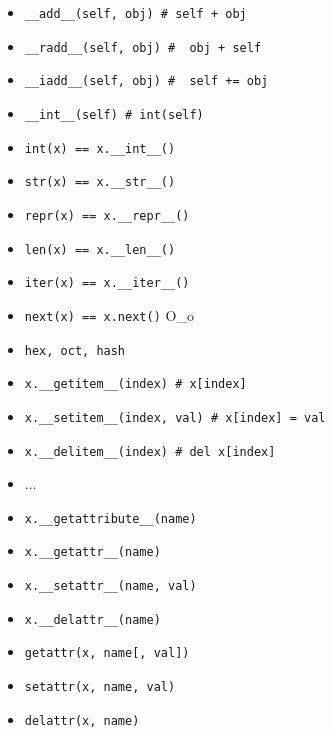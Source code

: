 \documentclass{article}
\begin{document}
\begin{itemize}
	\item \lstinline!__add__(self, obj) # self + obj!
	\item \lstinline!__radd__(self, obj) #  obj + self!
	\item \lstinline!__iadd__(self, obj) #  self += obj!
	\item \lstinline!__int__(self) # int(self)!
\end{itemize}
\newpage
\begin{itemize}
	\item \lstinline!int(x) == x.__int__()!
	\item \lstinline!str(x) == x.__str__()!
	\item \lstinline!repr(x) == x.__repr__()!
	\item \lstinline!len(x) == x.__len__()!
	\item \lstinline!iter(x) == x.__iter__()!
	\item \lstinline!next(x) == x.next()! O\_o
	\item \lstinline!hex, oct, hash!
\end{itemize}
\newpage

\begin{itemize}
	\item \lstinline!x.__getitem__(index) # x[index]!
	\item \lstinline!x.__setitem__(index, val) # x[index] = val!
	\item \lstinline!x.__delitem__(index) # del x[index]!
	\item ...
\end{itemize}
\newpage

\begin{itemize}
	\item \lstinline!x.__getattribute__(name)!
	\item \lstinline!x.__getattr__(name)!
	\item \lstinline!x.__setattr__(name, val)!
	\item \lstinline!x.__delattr__(name)!
	\item \lstinline!getattr(x, name[, val])!
	\item \lstinline!setattr(x, name, val)!
	\item \lstinline!delattr(x, name)!
\end{itemize}
\newpage

\end{document}
